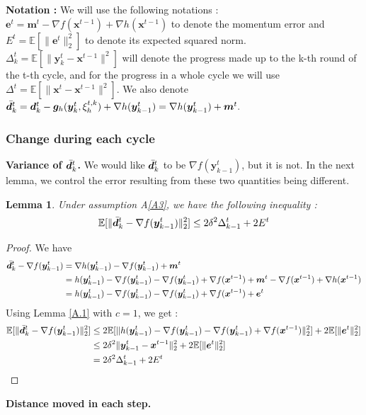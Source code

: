 \documentclass[10pt]{article} %
\theoremstyle{plain}
\newtheorem{lemma}[theorem]{Lemma}
\theoremstyle{definition}
\theoremstyle{remark}
\newcommand{\norm}[1]{\|#1\|_2}
\def\vd{{\bm{d}}}
\def\ve{{\bm{e}}}
\def\vg{{\bm{g}}}
\def\vm{{\bm{m}}}
\def\vx{{\bm{x}}}
\def\vy{{\bm{y}}}
\newcommand{\E}{\mathbb{E}}
\begin{document}
\textbf{Notation :} We will use the following notations : $\ve^t = \vm^t - \nabla f(\vx^{t-1}) + \nabla h(\vx^{t-1})$ to denote the momentum error and $E^t = \E[\norm{\ve^t}^2]$ to denote its expected squared norm. $\Delta^t_k = \E[\|\vy^t_k - \vx^{t-1}\|^2]$ will denote the progress made up to the k-th round of the t-th cycle, and for the progress in a whole cycle we will use $\Delta^t = \E[\|\vx^{t} - \vx^{t-1}\|^2]$. We also denote $\Bar{\vd}^t_k= \vd^t_k - \vg_h(\vy^{t}_k,\xi^{t,k}_h) + \nabla h(\vy^t_{k-1}) = \nabla h(\vy^t_{k-1}) + \vm^t.$

\subsubsection{Change during each cycle}
\textbf{Variance of $\Bar{\vd}^t_k$.} We would like $\Bar{\vd}^t_k$ to be $\nabla f(\vy^t_{k-1})$, but it is not. In the next lemma, we control the error resulting from these two quantities being different.

\begin{lemma}\label{lemmaVD}
Under assumption A\ref{A3}, we have the following inequality :
\[\E[\norm{\Bar{\vd}^t_k - \nabla f(\vy^t_{k-1})}^2] \leq 2\delta^2 \Delta^t_{k-1} + 2 E^t\]
\end{lemma}

\begin{proof}
We have 
\begin{align*}
    \Bar{\vd}^t_k - \nabla f(\vy^t_{k-1}) &= \nabla h(\vy^t_{k-1}) - \nabla f(\vy^t_{k-1}) + \vm^t \\
    &= h(\vy^t_{k-1}) - \nabla f(\vy^t_{k-1}) - \nabla f(\vy^t_{k-1}) + \nabla f(\vx^{t-1}) + \vm^t - \nabla f(\vx^{t-1}) + \nabla h(\vx^{t-1})\\
    &= h(\vy^t_{k-1}) - \nabla f(\vy^t_{k-1}) - \nabla f(\vy^t_{k-1}) + \nabla f(\vx^{t-1}) + \ve^t
\end{align*}
Using Lemma \ref{A.1} with $c=1$, we get :
\begin{align*}
    \E[\norm{\Bar{\vd}^t_k - \nabla f(\vy^t_{k-1})}^2] &\leq 2 \E[\norm{h(\vy^t_{k-1}) - \nabla f(\vy^t_{k-1}) - \nabla f(\vy^t_{k-1}) + \nabla f(\vx^{t-1})}^2] + 2 \E[\norm{\ve^t}^2]\\
    &\leq 2 \delta^2 \norm{\vy^t_{k-1} - \vx^{t-1}}^2 + 2 \E[\norm{\ve^t}^2]\\
    &= 2\delta^2 \Delta^t_{k-1} + 2 E^t
\end{align*}
\end{proof}

\textbf{Distance moved in each step.}
\end{document}
